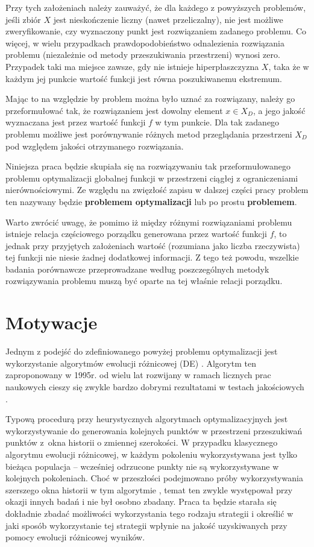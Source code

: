 \documentclass[12pt,a4paper]{report}
\begin{document}
{\par{
Przy tych założeniach należy zauważyć, że dla każdego z powyższych problemów, jeśli zbiór $X$ jest nieskończenie liczny (nawet przeliczalny), nie jest możliwe zweryfikowanie, czy wyznaczony punkt jest rozwiązaniem zadanego problemu. Co więcej, w wielu przypadkach prawdopodobieństwo odnalezienia rozwiązania problemu (niezależnie od metody przeszukiwania przestrzeni) wynosi zero. Przypadek taki ma miejsce zawsze, gdy nie istnieje hiperpłaszczyzna $X$, taka że w każdym jej punkcie wartość funkcji jest równa poszukiwanemu ekstremum.
}
\par{
Mając to na względzie by problem można było uznać za rozwiązany, należy go przeformułować tak, że rozwiązaniem jest dowolny element $x \in X_D$, a jego jakość wyznaczana jest przez wartość funkcji $f$ w tym punkcie. Dla tak zadanego problemu możliwe jest porównywanie różnych metod przeglądania przestrzeni $X_D$ pod względem jakości otrzymanego rozwiązania.
}
\par{
Niniejsza praca będzie skupiała się na rozwiązywaniu tak przeformułowanego problemu optymalizacji globalnej funkcji w przestrzeni ciągłej z ograniczeniami nierównościowymi. Ze względu na zwięzłość zapisu w dalszej części pracy problem ten nazywany będzie \textbf{problemem optymalizacji} lub po prostu \textbf{problemem}. 
}
\par{
Warto zwrócić uwagę, że pomimo iż między różnymi rozwiązaniami problemu istnieje relacja częściowego porządku generowana przez wartość funkcji $f$, to jednak przy przyjętych założeniach wartość (rozumiana jako liczba rzeczywista) tej funkcji nie niesie żadnej dodatkowej informacji. Z tego też powodu, wszelkie badania porównawcze przeprowadzane według poszczególnych metodyk rozwiązywania problemu muszą być oparte na tej właśnie relacji porządku.
}

\section{Motywacje}
\par{
Jednym z podejść do zdefiniowanego powyżej problemu optymalizacji jest wykorzystanie algorytmów ewolucji różnicowej (DE) \cite{RainerStorn}. Algorytm ten zaproponowany w 1995r. od wielu lat rozwijany w ramach licznych prac naukowych \cite{Opara,SpringerIntroToEvol} cieszy się zwykle bardzo dobrymi rezultatami w testach jakościowych \cite{CEC2013Comp}. 
}
\par{
Typową procedurą przy heurystycznych algorytmach optymalizacyjnych jest wykorzystywanie do generowania kolejnych punktów w przestrzeni przeszukiwań punktów z~okna historii o zmiennej szerokości. W przypadku klasycznego algorytmu ewolucji różnicowej, w każdym pokoleniu wykorzystywana jest tylko bieżąca populacja -- wcześniej odrzucone punkty nie są wykorzystywane w kolejnych pokoleniach. Choć w przeszłości podejmowano próby wykorzystywania szerszego okna historii w tym algorytmie \cite{JADE,SHADE}, temat ten zwykle występował przy okazji innych badań i nie był osobno zbadany. Praca ta będzie starała się dokładnie zbadać możliwości wykorzystania tego rodzaju strategii i określić w jaki sposób wykorzystanie tej strategii wpłynie na jakość uzyskiwanych przy pomocy ewolucji różnicowej wyników.
}

}
\end{document}
